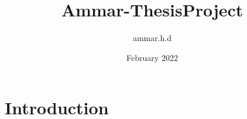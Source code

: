 \documentclass{article}
\title{Ammar-ThesisProject}
\author{ammar.h.d }
\date{February 2022}
\begin{document}
\maketitle

\section{Introduction}
\end{document}
